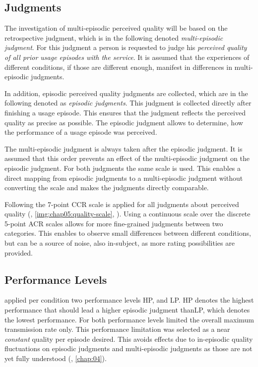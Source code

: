 \subsection{Judgments}
The investigation of multi-episodic perceived quality will be based on the retrospective judgment, which is in the following denoted \emph{multi-episodic judgment}.
For this judgment a person is requested to judge his \emph{perceived quality of all prior usage episodes with the service}.
It is assumed that the experiences of different conditions, if those are different enough, manifest in differences in multi-episodic judgments.

In addition, episodic perceived quality judgments are collected, which are in the following denoted as \emph{episodic judgments}.
This judgment is collected directly after finishing a usage episode.
This ensures that the judgment reflects the perceived quality as precise as possible.
The episodic judgment allows to determine, how the performance of a usage episode was perceived.

The multi-episodic judgment is always taken after the episodic judgment.
It is assumed that this order prevents an effect of the multi-episodic judgment on the episodic judgment.
For both judgments the same scale is used.
This enables a direct mapping from episodic judgments to a multi-episodic judgment without converting the scale and makes the judgments directly comparable.

Following \cite{moller_single-call_2011} the 7-point \ac{CCR} scale is applied for all judgments about perceived quality (\cf, \autoref{img:chap05:quality-scale}, ).
Using a continuous scale over the discrete 5-point \ac{ACR} scales allows for more fine-grained judgments between two categories.
This enables to observe small differences between different conditions, but can be a source of noise, also in-subject, as more rating possibilities are provided.

\subsection{Performance Levels}
\cite{moller_single-call_2011} applied per condition two performance levels \acf{HP}, and \acf{LP}.
\ac{HP} denotes the highest performance that should lead a higher episodic judgment than\ac{LP}, which denotes the lowest performance.
For both performance levels \cite{moller_single-call_2011} limited the overall maximum transmission rate only.
This performance limitation was selected as a near \emph{constant} quality per episode desired. %
This avoids effects due to in-episodic quality fluctuations on episodic judgments and multi-episodic judgments as those are not yet fully understood (\cf, \autoref{chap:04}).

